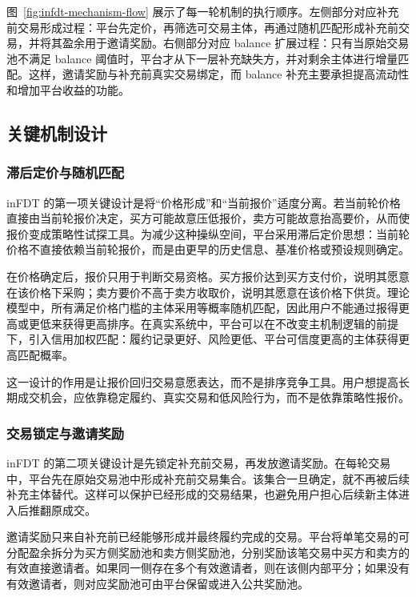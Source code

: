 \documentclass[UTF8,a4paper,12pt]{ctexart}
\begin{document}
图~\ref{fig:infdt-mechanism-flow} 展示了每一轮机制的执行顺序。左侧部分对应补充前交易形成过程：平台先定价，再筛选可交易主体，再通过随机匹配形成补充前交易，并将其盈余用于邀请奖励。右侧部分对应 balance 扩展过程：只有当原始交易池不满足 balance 阈值时，平台才从下一层补充缺失方，并对剩余主体进行增量匹配。这样，邀请奖励与补充前真实交易绑定，而 balance 补充主要承担提高流动性和增加平台收益的功能。

\subsection{关键机制设计}

\subsubsection{滞后定价与随机匹配}

inFDT 的第一项关键设计是将“价格形成”和“当前报价”适度分离。若当前轮价格直接由当前轮报价决定，买方可能故意压低报价，卖方可能故意抬高要价，从而使报价变成策略性试探工具。为减少这种操纵空间，平台采用滞后定价思想：当前轮价格不直接依赖当前轮报价，而是由更早的历史信息、基准价格或预设规则确定。

在价格确定后，报价只用于判断交易资格。买方报价达到买方支付价，说明其愿意在该价格下采购；卖方要价不高于卖方收取价，说明其愿意在该价格下供货。理论模型中，所有满足价格门槛的主体采用等概率随机匹配，因此用户不能通过报得更高或更低来获得更高排序。在真实系统中，平台可以在不改变主机制逻辑的前提下，引入信用加权匹配：履约记录更好、风险更低、平台可信度更高的主体获得更高匹配概率。

这一设计的作用是让报价回归交易意愿表达，而不是排序竞争工具。用户想提高长期成交机会，应依靠稳定履约、真实交易和低风险行为，而不是依靠策略性报价。

\subsubsection{交易锁定与邀请奖励}

inFDT 的第二项关键设计是先锁定补充前交易，再发放邀请奖励。在每轮交易中，平台先在原始交易池中形成补充前交易集合。该集合一旦确定，就不再被后续补充主体替代。这样可以保护已经形成的交易结果，也避免用户担心后续新主体进入后推翻原成交。

邀请奖励只来自补充前已经能够形成并最终履约完成的交易。平台将单笔交易的可分配盈余拆分为买方侧奖励池和卖方侧奖励池，分别奖励该笔交易中买方和卖方的有效直接邀请者。如果同一侧存在多个有效邀请者，则在该侧内部平分；如果没有有效邀请者，则对应奖励池可由平台保留或进入公共奖励池。
\end{document}
